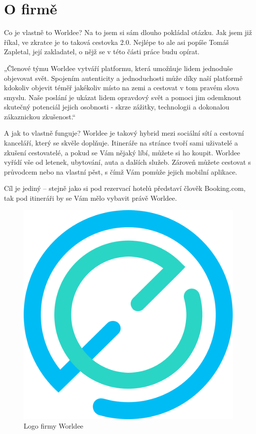 \section{O firmě}

Co je vlastně to Worldee? Na to jsem si sám dlouho pokládal otázku. Jak jsem již říkal, ve zkratce je to taková cestovka 2.0. Nejlépe to ale asi popíše Tomáš Zapletal, její zakladatel, o nějž se v této části práce budu opírat.\cite{WorldeeInfo}

„Členové týmu Worldee vytváří platformu, která umožňuje lidem jednoduše objevovat svět. Spojením autenticity a jednoduchosti může díky naší platformě kdokoliv objevit téměř jakékoliv místo na zemi a cestovat v tom pravém slova smyslu. Naše poslání je ukázat lidem opravdový svět a pomoci jim odemknout skutečný potenciál jejich osobnosti - skrze zážitky, technologii a dokonalou zákaznickou zkušenost.“

A jak to vlastně funguje? Worldee je takový hybrid mezi sociální sítí a cestovní kanceláří, který se skvěle doplňuje. Itineráře na stránce tvoří sami uživatelé a zkušení cestovatelé, a pokud se Vám nějaký líbí, můžete si ho koupit. Worldee vyřídí vše od letenek, ubytování, auta a dalších služeb. Zároveň můžete cestovat s průvodcem nebo na vlastní pěst, s čímž Vám pomůže jejich mobilní aplikace.

Cíl je jediný – stejně jako si pod rezervací hotelů představí člověk Booking.com, tak pod itineráři by se Vám mělo vybavit právě Worldee.
\\
\begin{figure}[!h]
    \centering
    \includegraphics[width=0.3\linewidth]{obrazky/worldee.png}
    \caption[Logo firmy Worldee]{Logo firmy Worldee\cite{Worldee}}
\end{figure}